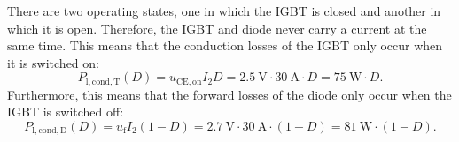 \begin{solutionblock}
There are two operating states, one in which the IGBT is closed and another in which it is open. Therefore, the IGBT and diode never carry a current at the same time. This means that the conduction losses of the IGBT only occur when it is switched on:
\begin{equation}
    P_{\mathrm{l,cond,T}}(D) = u_{\mathrm{CE,on}} I_\mathrm{2}  D = \SI {2.5}{\volt}\cdot \SI {30}{\ampere} \cdot D = \SI {75}{\watt} \cdot D .
\end{equation}
Furthermore, this means that the forward losses of the diode only occur when the IGBT is switched off:
\begin{equation}
    P_{\mathrm{l,cond,D}}(D)= u_{\mathrm{f}} I_\mathrm{2} (1-D)= \SI {2.7}{\volt}\cdot \SI {30}{\ampere} \cdot (1-D) = \SI {81}{\watt} \cdot (1-D) .
    \end{equation}
\end{solutionblock}

